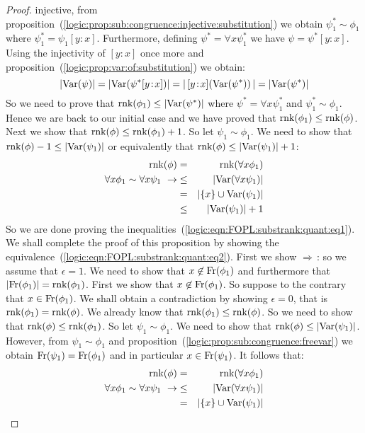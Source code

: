 \begin{proof}
injective, from
proposition~(\ref{logic:prop:sub:congruence:injective:substitution})
we obtain $\psi_{1}^{*}\sim\phi_{1}$ where
$\psi_{1}^{*}=\psi_{1}[y\!:\!x]$. Furthermore, defining
$\psi^{*}=\forall x\psi_{1}^{*}$ we have $\psi=\psi^{*}[y\!:\!x]$.
Using the injectivity of $[y\!:\!x]$ once more and
proposition~(\ref{logic:prop:var:of:substitution}) we obtain:
    \[
    |\mbox{\rm Var}(\psi)|=|\mbox{\rm Var}(\psi^{*}[y\!:\!x])|=
    |\,[y\!:\!x](\mbox{\rm Var}(\psi^{*}))\,|=|\mbox{\rm Var}(\psi^{*})|
    \]
So we need to prove that $\mbox{\rm rnk}(\phi_{1})\leq|\mbox{\rm Var}(\psi^{*})|$ where
$\psi^{*}=\forall x\psi_{1}^{*}$ and $\psi_{1}^{*}\sim\phi_{1}$.
Hence we are back to our initial case and we have proved that
$\mbox{\rm rnk}(\phi_{1})\leq\mbox{\rm rnk}(\phi)$. Next we show that
$\mbox{\rm rnk}(\phi)\leq\mbox{\rm rnk}(\phi_{1})+1$. So let $\psi_{1}\sim\phi_{1}$. We
need to show that $\mbox{\rm rnk}(\phi)-1\leq|\mbox{\rm Var}(\psi_{1})|$ or equivalently
that $\mbox{\rm rnk}(\phi)\leq|\mbox{\rm Var}(\psi_{1})|+1$:
    \begin{eqnarray*}
    \mbox{\rm rnk}(\phi)&=&\mbox{\rm rnk}(\forall x\phi_{1})\\
    \forall x\phi_{1}\sim\forall x\psi_{1}\ \rightarrow
    &\leq&|\mbox{\rm Var}(\forall x\psi_{1})|\\
    &=&|\{x\}\cup\mbox{\rm Var}(\psi_{1})|\\
    &\leq&|\mbox{\rm Var}(\psi_{1})|+1
    \end{eqnarray*}
So we are done proving the
inequalities~(\ref{logic:eqn:FOPL:substrank:quant:eq1}). We shall
complete the proof of this proposition by showing the
equivalence~(\ref{logic:eqn:FOPL:substrank:quant:eq2}). First we
show $\Rightarrow$\,: so we assume that $\epsilon=1$. We need to
show that $x\not\in\mbox{\rm Fr}(\phi_{1})$ and furthermore that
$|\mbox{\rm Fr}(\phi_{1})|=\mbox{\rm rnk}(\phi_{1})$. First we show that
$x\not\in\mbox{\rm Fr}(\phi_{1})$. So suppose to the contrary that
$x\in\mbox{\rm Fr}(\phi_{1})$. We shall obtain a contradiction by showing
$\epsilon=0$, that is $\mbox{\rm rnk}(\phi_{1})=\mbox{\rm rnk}(\phi)$. We already know
that $\mbox{\rm rnk}(\phi_{1})\leq\mbox{\rm rnk}(\phi)$. So we need to show that
$\mbox{\rm rnk}(\phi)\leq\mbox{\rm rnk}(\phi_{1})$. So let $\psi_{1}\sim\phi_{1}$. We
need to show that $\mbox{\rm rnk}(\phi)\leq|\mbox{\rm Var}(\psi_{1})|$. However, from
$\psi_{1}\sim\phi_{1}$ and
proposition~(\ref{logic:prop:sub:congruence:freevar}) we obtain
$\mbox{\rm Fr}(\psi_{1})=\mbox{\rm Fr}(\phi_{1})$ and in particular
$x\in\mbox{\rm Fr}(\psi_{1})$. It follows that:
    \begin{eqnarray*}
    \rnk(\phi)&=&\rnk(\forall x\phi_{1})\\
    \forall x\phi_{1}\sim\forall x\psi_{1}\ \rightarrow
    &\leq&|\var(\forall x\psi_{1})|\\
    &=&|\{x\}\cup\var(\psi_{1})|\\

\end{eqnarray*}
\end{proof}
